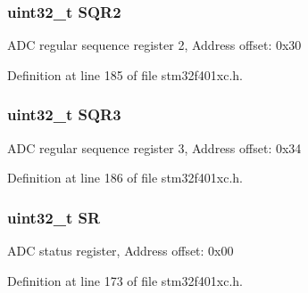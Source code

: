 \subsubsection[{\texorpdfstring{S\+Q\+R2}{SQR2}}]{ uint32\+\_\+t S\+Q\+R2}\hypertarget{struct_a_d_c___type_def_aab440b0ad8631f5666dd32768a89cf60}{}\label{struct_a_d_c___type_def_aab440b0ad8631f5666dd32768a89cf60}
A\+DC regular sequence register 2, Address offset\+: 0x30 

Definition at line 185 of file stm32f401xc.\+h.

\subsubsection[{\texorpdfstring{S\+Q\+R3}{SQR3}}]{ uint32\+\_\+t S\+Q\+R3}\hypertarget{struct_a_d_c___type_def_a97e40d9928fa25a5628d6442f0aa6c0f}{}\label{struct_a_d_c___type_def_a97e40d9928fa25a5628d6442f0aa6c0f}
A\+DC regular sequence register 3, Address offset\+: 0x34 

Definition at line 186 of file stm32f401xc.\+h.

\subsubsection[{\texorpdfstring{SR}{SR}}]{ uint32\+\_\+t SR}\hypertarget{struct_a_d_c___type_def_af6aca2bbd40c0fb6df7c3aebe224a360}{}\label{struct_a_d_c___type_def_af6aca2bbd40c0fb6df7c3aebe224a360}
A\+DC status register, Address offset\+: 0x00 

Definition at line 173 of file stm32f401xc.\+h.



